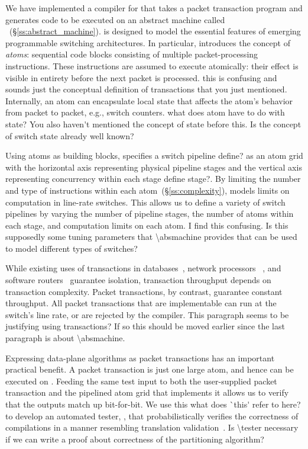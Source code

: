We have implemented a compiler for \pktlanguage that takes a packet
transaction program and generates code to be executed on an abstract machine
called \absmachine~(\S\ref{ss:abstract_machine}). \absmachine is designed 
to model the essential
features of emerging programmable switching architectures.  In particular,
\absmachine introduces the concept of {\em atoms}: 
sequential code blocks consisting of
multiple packet-processing instructions. These instructions are assumed to
execute atomically: their effect is visible in entirety before the next packet
is processed. \ac{this is confusing and sounds just the conceptual definition
of transactions that you just mentioned.}
Internally, an atom can encapsulate local state that affects the
atom's behavior from packet to packet, e.g., switch counters.
\ac{what does atom have to do with state? You also haven't mentioned 
the concept of state before this. Is the concept of switch state already 
well known?}

Using atoms as building blocks, \absmachine specifies a switch pipeline 
\ac{define?} as an
atom grid with the horizontal axis representing physical pipeline stages and
the vertical axis representing concurrency within each stage \ac{define stage?}. 
By limiting the
number and type of instructions within each atom~(\S\ref{ss:complexity}),
\absmachine models limits on computation in line-rate switches. This allows us
to define a variety of switch pipelines by varying the number of pipeline
stages, the number of atoms within each stage, and computation limits on each atom. \ac{I find this confusing. Is this supposedly some tuning parameters that
\absmachine provides that can be used to model different types of switches?}

While existing uses of transactions in databases~\cite{db_trans}, network
processors ~\cite{npus}, and software routers~\cite{click} guarantee isolation,
transaction throughput depends on transaction complexity. Packet transactions,
by contrast, guarantee constant throughput. All packet transactions that are
implementable can run at the switch's line rate, or are rejected by the compiler.
\ac{This paragraph seems to be justifying using transactions? If so this 
should be moved earlier since the last paragraph is about \absmachine.}

Expressing data-plane algorithms as packet transactions has an important
practical benefit.  A packet transaction is just one large atom, and hence can
be executed on \absmachine.  Feeding the same test input to both the
user-supplied packet transaction and the pipelined atom grid that implements it
allows us to verify that the outputs match up bit-for-bit. We use this 
\ac{what does `this' refer to here?} to
develop an automated tester, \tester, that probabilistically verifies the
correctness of compilations in a manner resembling translation
validation~\cite{necula_validation}. \ac{Is \tester necessary if we can write
a proof about correctness of the partitioning algorithm?}

